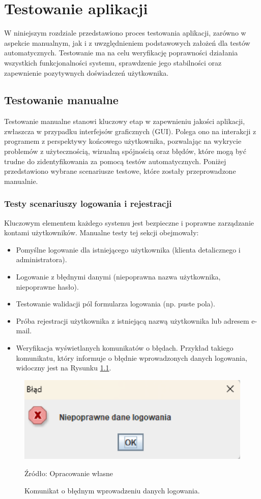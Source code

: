 
\chapter{Testowanie aplikacji}

W niniejszym rozdziale przedstawiono proces testowania aplikacji, zarówno w aspekcie manualnym, jak i z uwzględnieniem podstawowych założeń dla testów automatycznych. Testowanie ma na celu weryfikację poprawności działania wszystkich funkcjonalności systemu, sprawdzenie jego stabilności oraz zapewnienie pozytywnych doświadczeń użytkownika.

\section{Testowanie manualne}
Testowanie manualne stanowi kluczowy etap w zapewnieniu jakości aplikacji, zwłaszcza w przypadku interfejsów graficznych (GUI). Polega ono na interakcji z programem z perspektywy końcowego użytkownika, pozwalając na wykrycie problemów z użytecznością, wizualną spójnością oraz błędów, które mogą być trudne do zidentyfikowania za pomocą testów automatycznych. Poniżej przedstawiono wybrane scenariusze testowe, które zostały przeprowadzone manualnie.
\clearpage

\begin{minipage}{\linewidth}
\subsection{Testy scenariuszy logowania i rejestracji}
Kluczowym elementem każdego systemu jest bezpieczne i poprawne zarządzanie kontami użytkowników. Manualne testy tej sekcji obejmowały:
\begin{itemize}
    \item Pomyślne logowanie dla istniejącego użytkownika (klienta detalicznego i administratora).
    \item Logowanie z błędnymi danymi (niepoprawna nazwa użytkownika, niepoprawne hasło).
    \item Testowanie walidacji pól formularza logowania (np. puste pola).
    \item Próba rejestracji użytkownika z istniejącą nazwą użytkownika lub adresem e-mail.
    \item Weryfikacja wyświetlanych komunikatów o błędach. Przykład takiego komunikatu, który informuje o błędnie wprowadzonych danych logowania, widoczny jest na Rysunku \ref{fig:bledne_logowanie}.
\end{itemize}

\begin{figure}[H]
    \centering
    \includegraphics[width=0.5\linewidth]{figures/fig_0004.eps}
    \caption{Komunikat o błędnym wprowadzeniu danych logowania. }
    \label{fig:bledne_logowanie}
    \small{Źródło: Opracowanie własne}
\end{figure}
\end{minipage}

